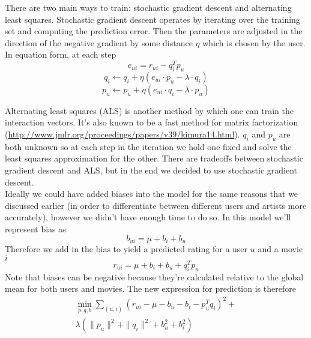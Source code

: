 \documentclass[fleqn,10pt]{SelfArx} %
\begin{document}
\noindent There are two main ways to train: stochastic gradient descent and alternating least squares. Stochastic gradient descent operates by iterating over the training set and computing the prediction error. Then the parameters are adjusted in the direction of the negative gradient by some distance $\eta$ which is chosen by the user. In equation form, at each step
$$e_{ui} = r_{ui} - q^T_ip_u$$
$$q_i \leftarrow q_i +\eta\left(e_{ui}\cdot p_{u} - \lambda\cdot q_i\right)$$
$$p_u \leftarrow p_u + \eta\left(e_{ui}\cdot q_i - \lambda\cdot p_u\right)$$

Alternating least squares (ALS) is another method by which one can train the interaction vectors. It's also known to be a fast method for matrix factorization (\url{http://www.jmlr.org/proceedings/papers/v39/kimura14.html}). $q_i$ and $p_u$ are both unknown so at each step in the iteration we hold one fixed and solve the least squares approximation for the other. There are tradeoffs between stochastic gradient descent and ALS, but in the end we decided to use stochastic gradient descent.\\

\noindent Ideally we could have added biases into the model for the same reasons that we discussed earlier (in order to differentiate between different users and artists more accurately), however we didn't have enough time to do so. In this model we'll represent bias as
$$b_{ui} = \mu + b_i + b_u$$
Therefore we add in the bias to yield a predicted rating for a user $u$ and a movie $i$
$$r_{ui} = \mu + b_i + b_u + q^T_ip_u$$
Note that biases can be negative because they're calculated relative to the global mean for both users and movies. The new expression for prediction is therefore
\begin{multline*}
\min_{p,q,b} \sum_{(u,i)} \left(r_{ui} - \mu - b_u - b_i - p^T_uq_i\right)^2 + \\
\lambda\left(\|p_u\|^2 + \|q_i\|^2 + b_u^2 + b_i^2\right)
\end{multline*}
\end{document}
